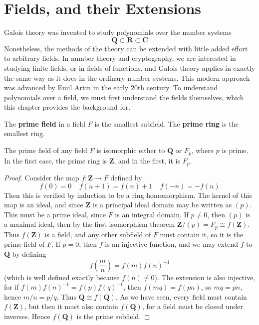 \chapter{Fields, and their Extensions}

Galois theory was invented to study polynomials over the number systems
%
\[ \mathbf{Q} \subset \mathbf{R} \subset \mathbf{C} \]
%
Nonetheless, the methods of the theory can be extended with little added effort to arbitrary fields. In number theory and cryptography, we are interested in studying finite fields, or in fields of functions, and Galois theory applies in exactly the same way as it does in the ordinary number systems. This modern approach was advanced by Emil Artin in the early 20th century. To understand polynomials over a field, we must first understand the fields themselves, which this chapter provides the background for.

\begin{definition}
    The {\bf prime field} in a field $F$ is the smallest subfield. The {\bf prime ring} is the smallest ring.
\end{definition}

\begin{lemma}
    The prime field of any field $F$ is isomorphic either to $\mathbf{Q}$ or $F_p$, where $p$ is prime. In the first case, the prime ring is $\mathbf{Z}$, and in the first, it is $F_p$.
\end{lemma}
\begin{proof}
    Consider the map $f: \mathbf{Z} \to F$ defined by
    \[ f(0) = 0\ \ \ \ \ f(n+1) = f(n) + 1\ \ \ \ \ f(-n) = -f(n) \]
    Then this is verified by induction to be a ring homomorphism. The kernel of this map is an ideal, and since $\mathbf{Z}$ is a principal ideal domain may be written as $(p)$. This must be a prime ideal, since $F$ is an integral domain. If $p \neq 0$, then $(p)$ is a maximal ideal, then by the first isomorphism theorem $\mathbf{Z} / (p) = F_p \cong f(\mathbf{Z})$. Thus $f(\mathbf{Z})$ is a field, and any other subfield of $F$ must contain it, so it is the prime field of $F$. If $p = 0$, then $f$ is an injective function, and we may extend $f$ to $\mathbf{Q}$ by defining
    \[ f\left( \frac{m}{n} \right) = f(m) f(n)^{-1} \]
    (which is well defined exactly because $f(n) \neq 0$). The extension is also injective, for if $f(m) f(n)^{-1} = f(p) f(q)^{-1}$, then $f(mq) = f(pn)$, so $mq = pn$, hence $m/n = p/q$. Thus $\mathbf{Q} \cong f(\mathbf{Q})$. As we have seen, every field must contain $f(\mathbf{Z})$, but then it must also contain $f(\mathbf{Q})$, for a field must be closed under inverses. Hence $f(\mathbf{Q})$ is the prime subfield.
\end{proof}

